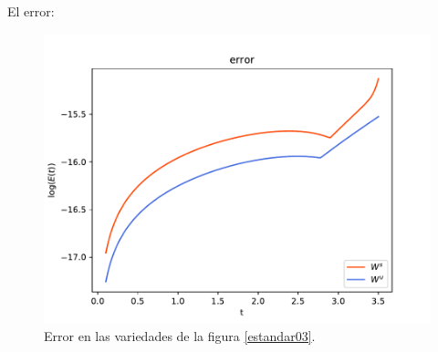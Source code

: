 \documentclass[11pt]{beamer}
\theoremstyle{definition}
\begin{document}
\begin{frame}
El error:
\begin{figure}[H]
\centering
\includegraphics[scale=0.5]{errork03} 
\caption{Error en las variedades de la figura \ref{estandar03}.}
\label{error est k03}
\end{figure}
\end{frame}
\end{document}
